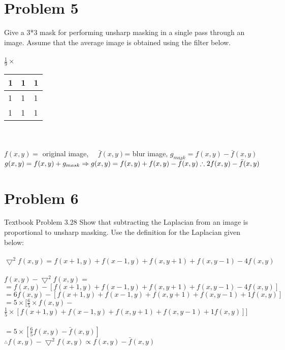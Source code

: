 \documentclass[12pt]{article}
\begin{document}
    \section{Problem 5}
    Give a 3*3 mask for performing unsharp masking in a single pass through an image.
    Assume that the average image is obtained using the filter below.
    \\
    \\
    $\frac{1}{9} \times$  \begin{tabular}{ | l | l | l | }
        \hline
        1 & 1 & 1\\\hline
        1 & 1 & 1\\\hline
        1 & 1 & 1\\\hline
    \end{tabular}
    \\
    \\
    $f(x,y)=$ original image, \ \ $\bar{f}(x,y)$= blur image, 
    $g_{mask}=f(x,y)-\bar{f}(x,y)$\\
    $g(x,y)= f(x,y)+g_{mask} \Rightarrow g(x,y)= f(x,y)+f(x,y)-\bar{f}(x,y)\\
    \therefore 2f(x,y)-\bar{f}(x,y) $ \\
    
    \section{Problem 6}
    Textbook Problem 3.28
    Show that subtracting the Laplacian from an image is proportional to unsharp masking. 
    Use the definition for the Laplacian given below:
    \\
    \\
    $\bigtriangledown^{2}f(x,y)= f(x+1, y) + f(x-1,y) + f(x,y+1)+f(x,y-1)-4f(x,y)$ \\
    \\
    $f(x,y)-\bigtriangledown^{2}f(x,y)=$\\
    $=f(x,y)-[f(x+1, y) + f(x-1,y) + f(x,y+1)+f(x,y-1)-4f(x,y)]$\\
    $=6f(x,y)-[f(x+1, y) + f(x-1,y) + f(x,y+1)+f(x,y-1)+1f(x,y)]$\\
    $=5 \times [ \frac{6}{5} \times f(x,y)-$\\
    $ \frac{1}{5} \times [f(x+1, y) + f(x-1,y) + f(x,y+1)+ f(x,y-1)+1f(x,y)]]$\\
    \\
    $=5 \times [\frac{6}{5}f(x,y)-\bar{f}(x,y)]$ \\
    $\therefore  f(x,y) - \bigtriangledown^{2} f(x,y) \propto f(x,y)-\bar{f}(x,y) $
\end{document}
